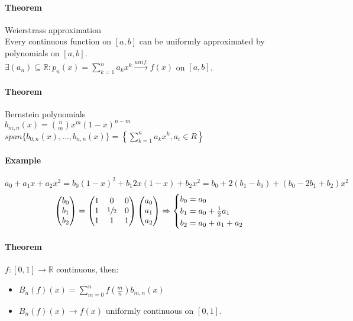 \documentclass{article}
\newcommand{\DS}{\displaystyle}
\newcommand{\func}[3]{#1 : #2 \rightarrow #3}
\newcommand{\tounif}{\xrightarrow{unif.}}
\newcommand{\sumn}[1]{\sum_{k=1}^n #1}
\newcommand{\intcc}[1]{\left[#1\right]}
\newcommand{\R}{\mathbb{R}}
\newcommand{\vecThree}[3]{\begin{pmatrix}#1 \\ #2 \\ #3\end{pmatrix}}
\newcommand{\Theorem}{\paragraph{Theorem}}
\newcommand{\Example}{\paragraph{Example}}
\begin{document}
  \Theorem Weierstrass approximation
\\Every continuous function on $\intcc{a,b}$ can be uniformly approximated by
  polynomials on $\intcc{a,b}$.
\\$\DS \exists (a_n) \subseteq \R : p_n(x) = \sumn a_k x^k \tounif f(x)$ on
  $\intcc{a,b}$.

  \Theorem Bernstein polynomials
\\$b_{m,n}(x) = \binom{n}{m} x^m (1-x)^{n-m}$
\\$\DS span \{ b_{0,n}(x), \hdots, b_{n,n}(x) \} = \left\{ \sumn a_k x^k, a_i
  \in R \right\}$

  \Example
  \begin{equation*}
    a_0 + a_1x + a_2 x^2 = b_0 (1 - x)^2 + b_1 2x (1-x) + b_2 x^2 =
    b_0 + 2 (b_1 - b_0) + (b_0 - 2b_1 + b_2) x^2
  \end{equation*}
  \begin{equation*}
    \vecThree{b_0}{b_1}{b_2} = \begin{pmatrix}
      1 & 0 & 0 \\
      1 & \sfrac{1}{2} & 0 \\
      1 & 1 & 1
    \end{pmatrix} \vecThree{a_0}{a_1}{a_2} \Rightarrow
    \begin{cases}
      b_0 = a_0 \\
      b_1 = a_0 + \frac{1}{2} a_1 \\
      b_2 = a_0 + a_1 + a_2
    \end{cases}
  \end{equation*}

  \Theorem $\func{f}{\intcc{0,1}}{\R}$ continuous, then:
  \begin{itemize}
    \item $\DS B_n(f)(x) = \sum_{m=0}^{n} f(\frac{m}{n}) b_{m,n}(x)$
    \item $B_n(f)(x) \to f(x)$ uniformly continuous on $\intcc{0,1}$.
  \end{itemize}
\end{document}
